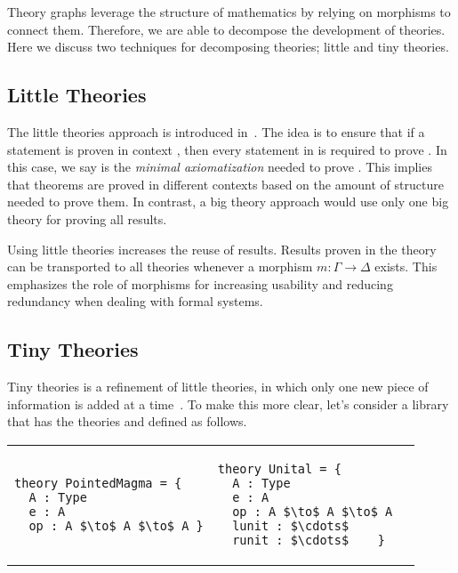 Theory graphs leverage the structure of mathematics by relying on morphisms to connect them. Therefore, we are able to decompose the development of theories. Here we discuss two techniques for decomposing theories; little and tiny theories.  

\subsection{Little Theories}
The little theories approach is introduced in~\cite{LittleTheories}. The idea is to ensure that if a statement  is proven in context \lstmath{$\Gamma$}, then every statement in \lstmath{$\Gamma$} is required to prove . In this case, we say \lstmath{$\Gamma$} is the \emph{minimal axiomatization} needed to prove . This implies that theorems are proved in different contexts based on the amount of structure needed to prove them. In contrast, a big theory approach would use only one big theory for proving all results. 

Using little theories increases the reuse of results. Results proven in the theory \lstmath{$\Gamma$} can be transported to all theories \lstmath{$\Delta$} whenever a morphism $m : \Gamma \to \Delta$ exists. This emphasizes the role of morphisms for increasing usability and reducing redundancy when dealing with formal systems.  

\subsection{Tiny Theories}
Tiny theories is a refinement of little theories, in which only one new piece of information is added at a time~\cite{mathscheme2011experiments}. To make this more clear, let's consider a library that has the theories  and  defined as follows. \\
\begin{tabular}{p{7cm} p{7cm}}
\begin{lstlisting}[mathescape]
theory PointedMagma = { 
  A : Type 
  e : A 
  op : A $\to$ A $\to$ A }
\end{lstlisting}
&
\begin{lstlisting}[mathescape]
theory Unital = {
  A : Type 
  e : A 
  op : A $\to$ A $\to$ A 
  lunit : $\cdots$
  runit : $\cdots$    }   
\end{lstlisting}
\end{tabular}

